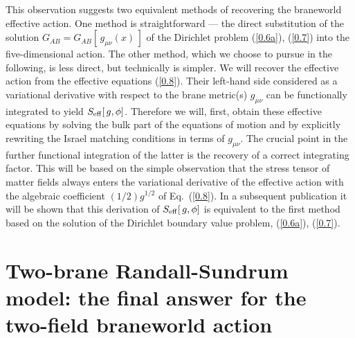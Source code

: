 \documentclass[a4paper,preprint,nofootinbib,
                 showpacs,preprintnumbers,amsmath,amssymb]{revtex4}
\begin{document}
This observation suggests two equivalent methods of recovering the braneworld 
effective action. One method is straightforward --- the direct substitution of 
the solution $G_{AB}=G_{AB}[\,g_{\mu\nu}(x)\,]$ of the Dirichlet problem 
(\ref{0.6a}), (\ref{0.7}) into the five-dimensional action. The other method, 
which we choose to pursue in the following, is less direct, but technically is 
simpler. We will recover the effective action from the effective equations 
(\ref{0.8}).  Their left-hand side considered as a variational derivative with 
respect to the brane metric(s) $g_{\mu\nu}$ can be functionally integrated to 
yield $S_{\rm eff}[\,g,\phi]$.  Therefore we will, first, obtain these 
effective equations by solving the bulk part of the equations of motion and by 
explicitly rewriting the Israel matching conditions in terms of $g_{\mu\nu}$. 
The crucial point in the further functional integration of the latter is the 
recovery of a correct integrating factor.  This will be based on the simple 
observation that the stress tensor of matter fields always enters the 
variational derivative of the effective action with the algebraic coefficient 
$(1/2)g^{1/2}$ of Eq.~(\ref{0.8}). In a subsequent publication \cite{duality}  
it will be shown that this derivation of $S_{\rm eff}[\,g,\phi]$ is  
equivalent to 
the first method based on the solution of the Dirichlet boundary value 
problem, (\ref{0.6a}), (\ref{0.7}). 
 
 
\section{Two-brane Randall-Sundrum model: the final answer 
for the two-field braneworld action\label{answer}} 
 
\end{document}
